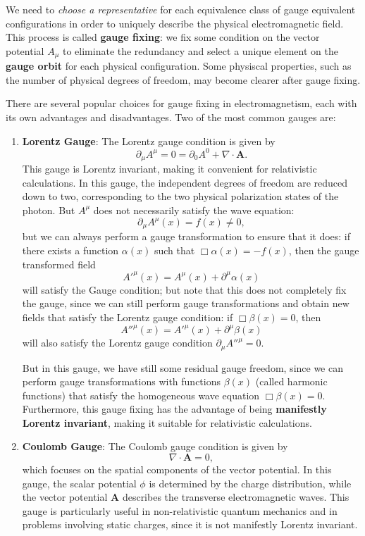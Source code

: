 We need to \textit{choose a representative} for each equivalence class of gauge equivalent configurations in order to uniquely describe the physical electromagnetic field. This process is called \textbf{gauge fixing}: we fix some condition on the vector potential \(A_\mu\) to eliminate the redundancy and select a unique element on the \textbf{gauge orbit} for each physical configuration. Some physiscal properties, such as the number of physical degrees of freedom, may become clearer after gauge fixing.

There are several popular choices for gauge fixing in electromagnetism, each with its own advantages and disadvantages. Two of the most common gauges are:
\begin{enumerate}
    \item \textbf{Lorentz Gauge}: The Lorentz gauge condition is given by
          \[
              \partial_\mu A^\mu = 0 = \partial_0 A^0 + \nabla \cdot \mathbf{A}.
          \]
          This gauge is Lorentz invariant, making it convenient for relativistic calculations. In this gauge, the independent degrees of freedom are reduced down to two, corresponding to the two physical polarization states of the photon.
          But \(A^{\mu} \) does not necessarily satisfy the wave equation:
          \[
              \partial_\mu A^\mu(x) = f(x) \neq 0,
          \]
          but we can always perform a gauge transformation to ensure that it does: if there exists a function \(\alpha(x)\) such that \(\Box \alpha(x) = - f(x)\), then the gauge transformed field
          \[
              A'^{\mu}(x) = A^{\mu}(x) + \partial^{\mu} \alpha(x)
          \]
          will satisfy the Gauge condition; but note that this does not completely fix the gauge, since we can still perform gauge transformations and obtain new fields that satisfy the Lorentz gauge condition: if \(\Box \beta(x) = 0\), then
          \[
              A''^{\mu}(x) = A'^{\mu}(x) + \partial^{\mu} \beta(x)
          \]
          will also satisfy the Lorentz gauge condition \(\partial_\mu A''^\mu = 0\).

          But in this gauge, we have still some residual gauge freedom, since we can perform gauge transformations with functions \(\beta(x)\) (called harmonic functions) that satisfy the homogeneous wave equation \(\Box \beta(x) = 0\). Furthermore, this gauge fixing has the advantage of being \textbf{manifestly Lorentz invariant}, making it suitable for relativistic calculations.

    \item \textbf{Coulomb Gauge}: The Coulomb gauge condition is given by
          \[
              \nabla \cdot \mathbf{A} = 0,
          \]
          which focuses on the spatial components of the vector potential. In this gauge, the scalar potential \(\phi\) is determined by the charge distribution, while the vector potential \(\mathbf{A}\) describes the transverse electromagnetic waves. This gauge is particularly useful in non-relativistic quantum mechanics and in problems involving static charges, since it is not manifestly Lorentz invariant.


\end{enumerate}
